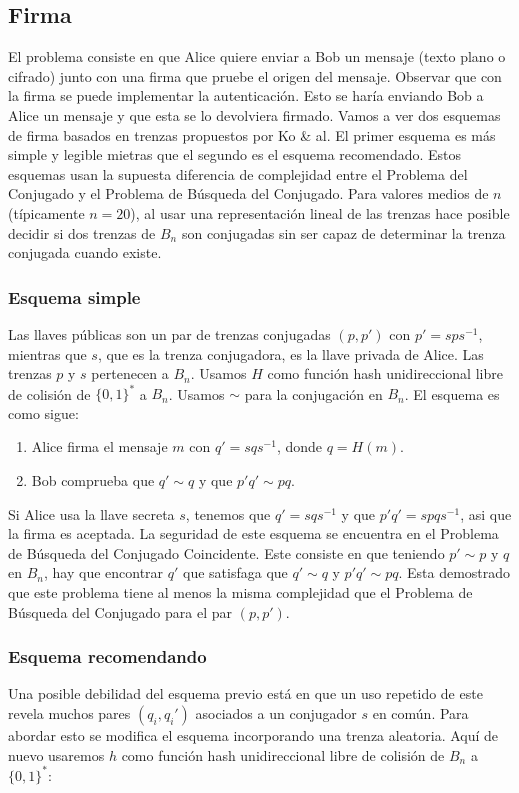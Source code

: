 \documentclass[12pt]{article}
\theoremstyle{definition}
\begin{document}
\subsection{Firma}
El problema consiste en que Alice quiere enviar a Bob un mensaje (texto plano o cifrado) junto con una firma que pruebe el origen del mensaje. Observar que con la firma se puede implementar la autenticación. Esto se haría enviando Bob a Alice un mensaje y que esta se lo devolviera firmado.
\newline
\newline
Vamos a ver dos esquemas de firma basados en trenzas propuestos por Ko \& al. El primer esquema es más simple y legible mietras que el segundo es el esquema recomendado. Estos esquemas usan la supuesta diferencia de complejidad entre el Problema del Conjugado y el Problema de Búsqueda del Conjugado. Para valores medios de $n$ (típicamente $n=20$), al usar una representación lineal de las trenzas hace posible decidir si dos trenzas de $B_n$ son conjugadas sin ser capaz de determinar la trenza conjugada cuando existe.

\subsubsection{Esquema simple}
Las llaves públicas son un par de trenzas conjugadas $(p,p')$ con $p'=sps^{-1}$, mientras que $s$, que es la trenza conjugadora, es la llave privada de Alice. Las trenzas $p$ y $s$ pertenecen a $B_n$. Usamos $H$ como función hash unidireccional libre de colisión de $\{0,1\}^*$ a $B_n$. Usamos $\sim$ para la conjugación en $B_n$. El esquema es como sigue:


\begin{enumerate}
\item Alice firma el mensaje $m$ con $q'=sqs^{-1}$, donde $q=H(m)$.
\item Bob comprueba que $q'\sim q$ y que $p'q'\sim pq$.
\end{enumerate}

Si Alice usa la llave secreta $s$, tenemos que $q'=sqs^{-1}$ y que $p'q'=spqs^{-1}$, asi que la firma es aceptada. La seguridad de este esquema se encuentra en el Problema de Búsqueda del Conjugado Coincidente. Este consiste en que teniendo $p'\sim p$ y $q$ en $B_n$, hay que encontrar $q'$ que satisfaga que $q'\sim q$ y $p'q'\sim pq$. Esta demostrado que este problema tiene al menos la misma complejidad que el Problema de Búsqueda del Conjugado para el par $(p,p')$.

\subsubsection{Esquema recomendando}
Una posible debilidad del esquema previo está en que un uso repetido de este revela muchos pares $(q_i,q_i')$ asociados a un conjugador $s$ en común. Para abordar esto se modifica el esquema incorporando una trenza aleatoria. Aquí de nuevo usaremos $h$ como función hash unidireccional libre de colisión de $B_n$ a $\{0,1\}^*$:
\end{document}
